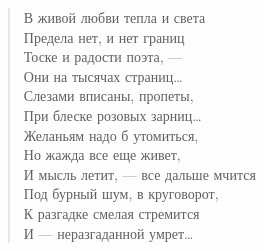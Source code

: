 
\vspace*{0cm}
\begin{verse}
\begin{altverse}
В живой любви тепла и света\\
Предела нет, и нет границ\\
Тоске и радости поэта, --- \\
Они на тысячах страниц\ldots\\
Слезами вписаны, пропеты, \\
При блеске розовых зарниц\ldots\\
Желаньям надо б утомиться,\\
Но жажда все еще живет,\\
И мысль летит, --- все дальше мчится\\
Под бурный шум, в круговорот,\\
К разгадке смелая стремится\\
И --- неразгаданной умрет\ldots
\end{altverse}
\end{verse}

\newpage
\vspace*{0cm}

